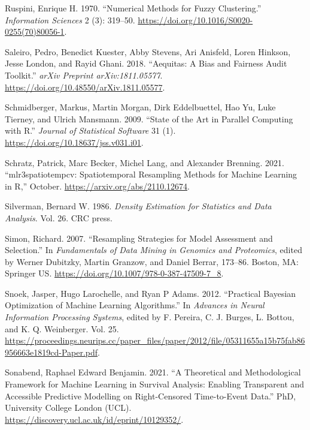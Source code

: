 \begin{CSLReferences}{1}{0}
\leavevmode{}%
Ruspini, Enrique H. 1970. {``Numerical Methods for Fuzzy Clustering.''}
\emph{Information Sciences} 2 (3): 319--50.
\url{https://doi.org/10.1016/S0020-0255(70)80056-1}.

\leavevmode{}%
Saleiro, Pedro, Benedict Kuester, Abby Stevens, Ari Anisfeld, Loren
Hinkson, Jesse London, and Rayid Ghani. 2018. {``Aequitas: A Bias and
Fairness Audit Toolkit.''} \emph{arXiv Preprint arXiv:1811.05577}.
\url{https://doi.org/10.48550/arXiv.1811.05577}.

\leavevmode{}%
Schmidberger, Markus, Martin Morgan, Dirk Eddelbuettel, Hao Yu, Luke
Tierney, and Ulrich Mansmann. 2009. {``State of the Art in Parallel
Computing with {R}.''} \emph{Journal of Statistical Software} 31 (1).
\url{https://doi.org/10.18637/jss.v031.i01}.

\leavevmode{}%
Schratz, Patrick, Marc Becker, Michel Lang, and Alexander Brenning.
2021. {``{mlr3spatiotempcv}: Spatiotemporal Resampling Methods for
Machine Learning in {R},''} October.
\url{https://arxiv.org/abs/2110.12674}.

\leavevmode{}%
Silverman, Bernard W. 1986. \emph{Density Estimation for Statistics and
Data Analysis}. Vol. 26. CRC press.

\leavevmode{}%
Simon, Richard. 2007. {``Resampling Strategies for Model Assessment and
Selection.''} In \emph{Fundamentals of Data Mining in Genomics and
Proteomics}, edited by Werner Dubitzky, Martin Granzow, and Daniel
Berrar, 173--86. {Boston, MA}: {Springer US}.
\url{https://doi.org/10.1007/978-0-387-47509-7_8}.

\leavevmode{}%
Snoek, Jasper, Hugo Larochelle, and Ryan P Adams. 2012. {``Practical
Bayesian Optimization of Machine Learning Algorithms.''} In
\emph{Advances in Neural Information Processing Systems}, edited by F.
Pereira, C. J. Burges, L. Bottou, and K. Q. Weinberger. Vol. 25.
\url{https://proceedings.neurips.cc/paper_files/paper/2012/file/05311655a15b75fab86956663e1819cd-Paper.pdf}.

\leavevmode{}%
Sonabend, Raphael Edward Benjamin. 2021. {``A Theoretical and
Methodological Framework for Machine Learning in Survival Analysis:
Enabling Transparent and Accessible Predictive Modelling on
Right-Censored Time-to-Event Data.''} PhD, University College London
(UCL). \url{https://discovery.ucl.ac.uk/id/eprint/10129352/}.


\end{CSLReferences}
